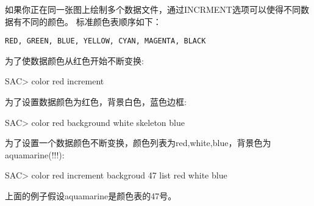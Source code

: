 如果你正在同一张图上绘制多个数据文件，通过INCRMENT选项可以使得不同数据有不同的颜色。
标准颜色表顺序如下：
\begin{lstlisting}[style=Shell]
RED, GREEN, BLUE, YELLOW, CYAN, MAGENTA, BLACK
\end{lstlisting}

为了使数据颜色从红色开始不断变换:
\begin{SACCode}
SAC> color red increment
\end{SACCode}

为了设置数据颜色为红色，背景白色，蓝色边框:
\begin{SACCode}
SAC> color red background white skeleton blue
\end{SACCode}

为了设置一个数据颜色不断变换，颜色列表为red,white,blue，背景色为aquamarine(!!!):
\begin{SACCode}
SAC> color red increment backgroud 47 list red white blue
\end{SACCode}
上面的例子假设aquamarine是颜色表的47号。
